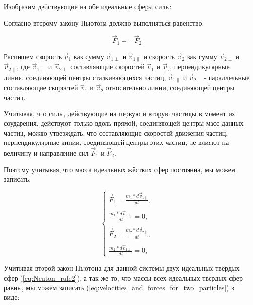 \documentclass{article}
\begin{document}
Изобразим действующие на обе идеальные сферы силы:


Согласно второму закону Ньютона должно выполняться равенство:

\begin{equation}\label{eq:Neuton_rule2}
        \vec{F}_1 = - \vec{F}_2
\end{equation}

Распишем скорость $ \vec{v}_1 $ как сумму $ \vec{v}_{1\perp} $ и $ \vec{v}_{1\parallel} $ и скорость $ \vec{v}_2 $ как сумму $ \vec{v}_{2\perp} $ и $ \vec{v}_{2\parallel} $, где $ \vec{v}_{1\perp} $ и $ \vec{v}_{2\perp} $ составляющие скоростей $ \vec{v}_1 $ и $ \vec{v}_2 $, перпендикулярные линии, соединяющей центры сталкивающихся частиц, $ \vec{v}_{1\parallel} $ и $ \vec{v}_{2\parallel} $ - параллельные составляющие скоростей $ \vec{v}_1 $ и $ \vec{v}_2 $ относительно линии, соединяющей центры частиц.

Учитывая, что силы, действующие на первую и вторую частицы в момент их соударения, действуют только вдоль прямой, соединяющей центры масс данных частиц, можно утверждать, что составляющие скоростей движения частиц, перпендикулярные линии, соединяющей центры этих частиц, не влияют на величину и направление сил $ \vec{F}_1 $ и $ \vec{F}_2 $.

Поэтому учитывая, что масса идеальных жёстких сфер постоянна, мы можем записать:

\begin{equation}\label{eq:velocities_and_forces_for_two_particles}
    \begin{cases}
        \vec{F}_1 = \displaystyle\frac{m_1*d\vec{v}_{1\parallel}}{dt},
        \\
        \\
        \displaystyle\frac{m_1*d\vec{v}_{1\perp}}{dt} = 0,
        \\
        \\
        \vec{F}_2 = \displaystyle\frac{m_2*d\vec{v}_{2\parallel}}{dt},
        \\
        \\
        \displaystyle\frac{m_2*d\vec{v}_{2\perp}}{dt} = 0,
    \end{cases}
\end{equation}

Учитывая второй закон Ньютона для данной системы двух идеальных твёрдых сфер (\ref{eq:Neuton_rule2}), а так же то, что массы всех идеальных твёрдых сфер равны, мы можем записать (\ref{eq:velocities_and_forces_for_two_particles}) в виде:
\end{document}
